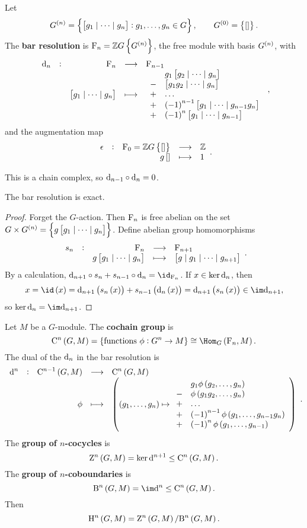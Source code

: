 \begin{definition}
Let
$$ G^{\br{n}} = \cbr{\sbr{g_1 \mid \dots \mid g_n} : g_1, \dots, g_n \in G}, \qquad G^{\br{0}} = \cbr{\sbr{}}. $$
The \textbf{bar resolution} is $ \F_n = \ZZ G\cbr{G^{\br{n}}} $, the free module with basis $ G^{\br{n}} $, with
$$ \function[\d_n]{\F_n}{\F_{n - 1}}{\sbr{g_1 \mid \dots \mid g_n}}{
\begin{array}{rl}
& g_1\sbr{g_2 \mid \dots \mid g_n} \\
- & \sbr{g_1g_2 \mid \dots \mid g_n} \\
+ & \dots \\
+ & \br{-1}^{n - 1}\sbr{g_1 \mid \dots \mid g_{n - 1}g_n} \\
+ & \br{-1}^n\sbr{g_1 \mid \dots \mid g_{n - 1}}
\end{array}
}, $$
and the augmentation map
$$ \function[\epsilon]{\F_0 = \ZZ G\cbr{\sbr{}}}{\ZZ}{g\sbr{}}{1}. $$
\end{definition}

\begin{fact*}
This is a chain complex, so $ \mathrm{d}_{n - 1} \circ \mathrm{d}_n = 0 $.
\end{fact*}

\begin{proposition}
The bar resolution is exact.
\end{proposition}

\begin{proof}
Forget the $ G $-action. Then $ \mathrm{F}_n $ is free abelian on the set $ G \times G^{\br{n}} = \cbr{g\sbr{g_1 \mid \dots \mid g_n}} $. Define abelian group homomorphisms
$$ \function[s_n]{\F_n}{\F_{n + 1}}{g\sbr{g_1 \mid \dots \mid g_n}}{\sbr{g \mid g_1 \mid \dots \mid g_{n + 1}}}. $$
By a calculation, $ \d_{n + 1} \circ s_n + s_{n - 1} \circ \d_n = \id_{\F_n} $. If $ x \in \ker \mathrm{d}_n $, then
$$ x = \id\br{x} = \d_{n + 1}\br{s_n\br{x}} + s_{n - 1}\br{\d_n\br{x}} = \d_{n + 1}\br{s_n\br{x}} \in \im \d_{n + 1}, $$
so $ \ker \d_n = \im \d_{n + 1} $.
\end{proof}

\pagebreak

Let $ M $ be a $ G $-module. The \textbf{cochain group} is
$$ \C^n\br{G, M} = \cbr{\text{functions} \ \phi : G^n \to M} \cong \Hom_G\br{\F_n, M}. $$
The dual of the $ \mathrm{d}_n $ in the bar resolution is
$$ \function[\d^n]{\C^{n - 1}\br{G, M}}{\C^n\br{G, M}}{\phi}{\br{\br{g_1, \dots, g_n} \mapsto
\begin{array}{rl}
& g_1\phi\br{g_2, \dots, g_n} \\
- & \phi\br{g_1g_2, \dots, g_n} \\
+ & \dots \\
+ & \br{-1}^{n - 1}\phi\br{g_1, \dots, g_{n - 1}g_n} \\
+ & \br{-1}^n\phi\br{g_1, \dots, g_{n - 1}}
\end{array}
}}. $$
The \textbf{group of $ n $-cocycles} is
$$ \Z^n\br{G, M} = \ker \d^{n + 1} \le \C^n\br{G, M}. $$
The \textbf{group of $ n $-coboundaries} is
$$ \B^n\br{G, M} = \im \d^n \le \C^n\br{G, M}. $$
Then
$$ \H^n\br{G, M} = \Z^n\br{G, M} / \B^n\br{G, M}. $$

